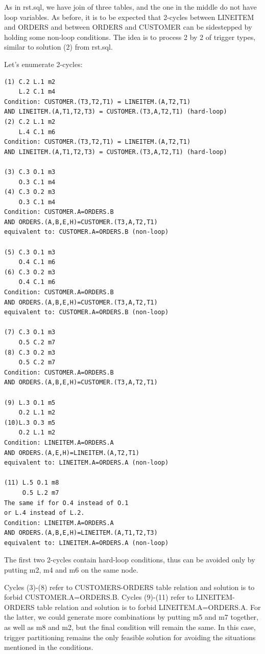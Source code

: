 \documentclass{sig-semester}
\begin{document}
As in rst.sql, we have join of three tables, and the one in the middle do not have loop variables. As before, it is to be expected that 2-cycles between LINEITEM and ORDERS and between ORDERS and CUSTOMER can be sidestepped by holding some non-loop conditions. The idea is to process 2 by 2 of trigger types, similar to solution (2) from rst.sql. 

\newpage
Let's enumerate 2-cycles:
\begin{verbatim}
(1) C.2 L.1 m2
    L.2 C.1 m4
Condition: CUSTOMER.(T3,T2,T1) = LINEITEM.(A,T2,T1) 
AND LINEITEM.(A,T1,T2,T3) = CUSTOMER.(T3,A,T2,T1) (hard-loop)
(2) C.2 L.1 m2   
    L.4 C.1 m6
Condition: CUSTOMER.(T3,T2,T1) = LINEITEM.(A,T2,T1)
AND LINEITEM.(A,T1,T2,T3) = CUSTOMER.(T3,A,T2,T1) (hard-loop)

(3) C.3 O.1 m3
    O.3 C.1 m4
(4) C.3 O.2 m3
    O.3 C.1 m4
Condition: CUSTOMER.A=ORDERS.B
AND ORDERS.(A,B,E,H)=CUSTOMER.(T3,A,T2,T1)
equivalent to: CUSTOMER.A=ORDERS.B (non-loop)

(5) C.3 O.1 m3
    O.4 C.1 m6        
(6) C.3 O.2 m3
    O.4 C.1 m6
Condition: CUSTOMER.A=ORDERS.B
AND ORDERS.(A,B,E,H)=CUSTOMER.(T3,A,T2,T1)
equivalent to: CUSTOMER.A=ORDERS.B (non-loop)

(7) C.3 O.1 m3
    O.5 C.2 m7     
(8) C.3 O.2 m3
    O.5 C.2 m7
Condition: CUSTOMER.A=ORDERS.B
AND ORDERS.(A,B,E,H)=CUSTOMER.(T3,A,T2,T1)

(9) L.3 O.1 m5
    O.2 L.1 m2
(10)L.3 O.3 m5
    O.2 L.1 m2
Condition: LINEITEM.A=ORDERS.A
AND ORDERS.(A,E,H)=LINEITEM.(A,T2,T1)
equivalent to: LINEITEM.A=ORDERS.A (non-loop)

(11) L.5 O.1 m8
     O.5 L.2 m7
The same if for O.4 instead of O.1
or L.4 instead of L.2.
Condition: LINEITEM.A=ORDERS.A
AND ORDERS.(A,B,E,H)=LINEITEM.(A,T1,T2,T3)
equivalent to: LINEITEM.A=ORDERS.A (non-loop)
\end{verbatim}

The first two 2-cycles contain hard-loop conditions, thus can be avoided only by putting m2, m4 and m6 on the same node.

Cycles (3)-(8) refer to CUSTOMERS-ORDERS table relation and solution is to forbid CUSTOMER.A=ORDERS.B. Cycles (9)-(11) refer to LINEITEM-ORDERS table relation and solution is to forbid LINEITEM.A=ORDERS.A. For the latter, we could generate more combinations by putting m5 and m7 together, as well as m8 and m2, but the final condition will remain the same. In this case, trigger partitioning remains the only feasible solution for avoiding the situations mentioned in the conditions.
\end{document}
